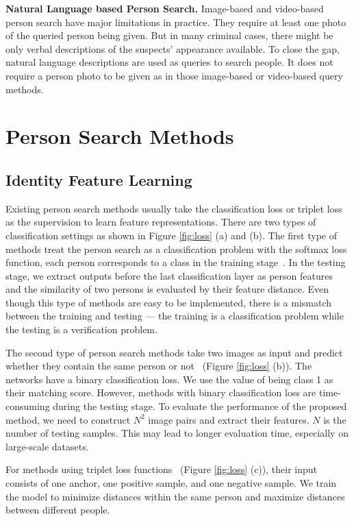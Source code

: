 \textbf{Natural Language based Person Search.} Image-based and video-based person search have major limitations in practice. They require at least one photo of the queried person being given. But in many criminal cases, there might be only verbal descriptions of the suspects' appearance available.
To close the gap, natural language descriptions are used as queries to search people. It does not require a person photo to be given as in those image-based or video-based query methods.

\section{Person Search Methods}
\label{ps:method}
\subsection{Identity Feature Learning}
Existing person search methods usually take the classification loss or triplet loss as the supervision to learn feature representations.
There are two types of classification settings as shown in Figure \ref{fig:loss} (a) and (b). The first type of methods treat the person search as a classification problem with the softmax loss function, \ie each person corresponds to a class in the training stage~\cite{xiao2016end,liao2015person,kumar2009attribute,xiao2016learning}. In the testing stage, we extract outputs before the last classification layer as person features and the similarity of two persons is evaluated by their feature distance. Even though this type of methods are easy to be implemented, there is a mismatch between the training and testing --- the training is a classification problem while the testing is a verification problem.

The second type of person search methods take two images as input and predict whether they contain the same person or not~\cite{ahmed2015improved,masi2016pose} (Figure \ref{fig:loss} (b)). The networks have a binary classification loss. We use the value of being class 1 as their matching score. However, methods with binary classification loss are time-consuming during the testing stage. To evaluate the performance of the proposed method, we need to construct $N^2$ image pairs and extract their features. $N$ is the number of testing samples. This may lead to longer evaluation time, especially on large-scale datasets.

For methods using triplet loss functions~\cite{cheng2016person,schroff2015facenet} (Figure \ref{fig:loss} (c)), their input consists of one anchor, one positive sample, and one negative sample. We train the model to minimize distances within the same person and maximize distances between different people. 

